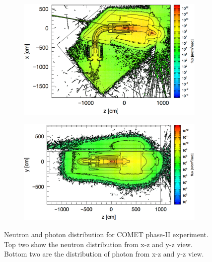   \begin{figure}[H]
   \begin{subfigure}{0.26\textwidth}
   \centering
   \includegraphics[scale=0.36]{chapter3/fig/photonzx.pdf}
   \end{subfigure}
   \hspace{0.2\textwidth}
   \begin{subfigure}{0.26\textwidth}
   \centering
   \includegraphics[scale=0.34]{chapter3/fig/photonyz.pdf}
   \end{subfigure}
   \caption{Neutron and photon distribution for COMET phase-II experiment. Top two show the neutron distribution from x-z and y-z view. Bottom two are the distribution of photon from x-z and y-z view.}
   \label{2photon}
  \end{figure}

